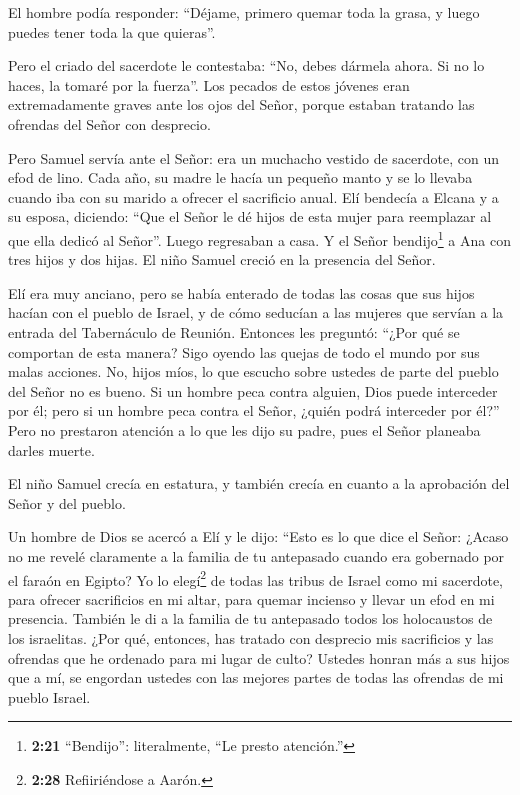  El hombre podía responder: ``Déjame, primero quemar toda
la grasa, y luego puedes tener toda la que quieras''.

Pero el criado del sacerdote le contestaba: ``No, debes dármela ahora.
Si no lo haces, la tomaré por la fuerza''.  Los pecados de
estos jóvenes eran extremadamente graves ante los ojos del Señor, porque
estaban tratando las ofrendas del Señor con desprecio.

 Pero Samuel servía ante el Señor: era un muchacho vestido
de sacerdote, con un efod de lino.  Cada año, su madre le
hacía un pequeño manto y se lo llevaba cuando iba con su marido a
ofrecer el sacrificio anual.  Elí bendecía a Elcana y a su
esposa, diciendo: ``Que el Señor le dé hijos de esta mujer para
reemplazar al que ella dedicó al Señor''. Luego regresaban a casa.
 Y el Señor bendijo\footnote{\textbf{2:21} ``Bendijo'':
  literalmente, ``Le presto atención.''} a Ana con tres hijos y dos
hijas. El niño Samuel creció en la presencia del Señor.

 Elí era muy anciano, pero se había enterado de todas las
cosas que sus hijos hacían con el pueblo de Israel, y de cómo seducían a
las mujeres que servían a la entrada del Tabernáculo de Reunión.
 Entonces les preguntó: ``¿Por qué se comportan de esta
manera? Sigo oyendo las quejas de todo el mundo por sus malas acciones.
 No, hijos míos, lo que escucho sobre ustedes de parte del
pueblo del Señor no es bueno.  Si un hombre peca contra
alguien, Dios puede interceder por él; pero si un hombre peca contra el
Señor, ¿quién podrá interceder por él?'' Pero no prestaron atención a lo
que les dijo su padre, pues el Señor planeaba darles muerte.

 El niño Samuel crecía en estatura, y también crecía en
cuanto a la aprobación del Señor y del pueblo.

 Un hombre de Dios se acercó a Elí y le dijo: ``Esto es lo
que dice el Señor: ¿Acaso no me revelé claramente a la familia de tu
antepasado cuando era gobernado por el faraón en Egipto? 
Yo lo elegí\footnote{\textbf{2:28} Refiiriéndose a Aarón.} de todas las
tribus de Israel como mi sacerdote, para ofrecer sacrificios en mi
altar, para quemar incienso y llevar un efod en mi presencia. También le
di a la familia de tu antepasado todos los holocaustos de los
israelitas.  ¿Por qué, entonces, has tratado con desprecio
mis sacrificios y las ofrendas que he ordenado para mi lugar de culto?
Ustedes honran más a sus hijos que a mí, se engordan ustedes con las
mejores partes de todas las ofrendas de mi pueblo Israel.

